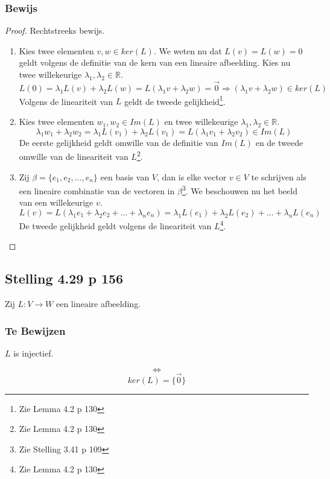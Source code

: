 \documentclass[lineaire_algebra_oplossingen.tex]{subfiles}
\begin{document}
\subsubsection*{Bewijs}
\begin{proof}
Rechtstreeks bewijs.
\begin{enumerate}
\item Kies twee elementen $v,w \in ker(L)$. We weten nu dat $L(v)=L(w)=0$ geldt volgens de definitie van de kern van een lineaire afbeelding. Kies nu twee willekeurige $\lambda_1,\lambda_2 \in \mathbb{R}$.
\[
 L(0) = \lambda_1L(v)+\lambda_2L(w) = L(\lambda_1v+\lambda_2w) = \vec{0}
 \Rightarrow  (\lambda_1v+\lambda_2w) \in ker(L)
\]
Volgens de lineariteit van $L$ geldt de tweede gelijkheid\footnote{Zie Lemma 4.2 p 130}.
\item Kies twee elementen $w_1,w_2 \in Im(L)$ en twee willekeurige $\lambda_1,\lambda_2 \in \mathbb{R}$.
\[
\lambda_1w_1+\lambda_2w_2 = \lambda_1L(v_1) + \lambda_2L(v_1) = L(\lambda_1v_1+\lambda_2v_2) \in Im(L)
\]
De eerste gelijkheid geldt omwille van de definitie van $Im(L)$ en de tweede omwille van de lineariteit van $L$\footnote{Zie Lemma 4.2 p 130}.
\item Zij $\beta = \{e_1,e_2,...,e_n\}$ een basis van $V$, dan is elke vector $v\in V$ te schrijven als een lineaire combinatie van de vectoren in $\beta$\footnote{Zie Stelling 3.41 p 109}. We beschouwen nu het beeld van een willekeurige $v$.
\[
L(v) = L(\lambda_1e_1+\lambda_2e_2 + ... + \lambda_ne_n) = \lambda_1L(e_1)+\lambda_2L(e_2) + ... + \lambda_nL(e_n)
\] 
De tweede gelijkheid geldt volgens de lineariteit van $L$\footnote{Zie Lemma 4.2 p 130}.
\end{enumerate}
\end{proof}

\subsection{Stelling 4.29 p 156}
Zij $L:V\rightarrow W$ een lineaire afbeelding.
\subsubsection*{Te Bewijzen}
\begin{center}
$L$ is injectief.
\end{center}
\[\Leftrightarrow\]
\[
ker(L) = \{\vec{0}\}
\]
\end{document}

